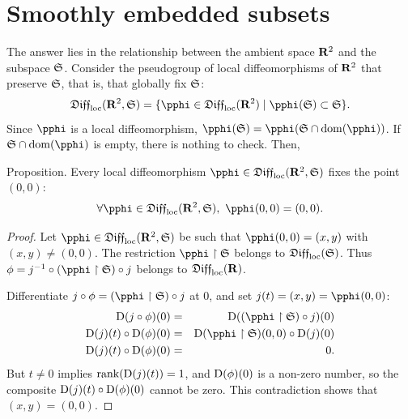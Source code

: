 \section{Smoothly embedded subsets}

The answer lies in the relationship between the ambient space $\mathbf{R}^2$ and the subspace ${\mathfrak S}$.
Consider the pseudogroup of local diffeomorphisms of $\mathbf{R}^2$ that preserve ${\mathfrak S}$,
that is,
that globally fix ${\mathfrak S}$:
$$
  \Diff_\loc(\RR^2,\fS) = \{\pphi \in \Diff_\loc(\RR^2) \mid \pphi(\fS) \subset \fS \}.
  $$
Since $\pphi$ is a local diffeomorphism, $\pphi(\fS) = \pphi(\fS \cap \Domain(\pphi))$.
If $\fS \cap \Domain(\pphi)$ is empty,
there is nothing to check.
Then,

\begin{Article}{Proposition.}{}
  Every local diffeomorphism $\pphi \in \Diff_\loc(\RR^2,\fS)$ fixes the point $(0,0)$:
  $$
    \forall \pphi \in \Diff_\loc(\RR^2,\fS),\ \pphi(0,0) = (0,0).
    $$
\end{Article}

\begin{proof}
  Let $\pphi \in \Diff_\loc(\RR^2,\fS)$ be such that $\pphi(0,0) = (x,y)$ with $(x,y) \neq (0,0)$.
  The restriction $\pphi \restriction \fS$ belongs to $\mathfrak{Diff}_{\mathrm{loc}}({\mathfrak S})$.
  Thus $\varphi = j^{-1} \circ (\pphi \restriction \fS) \circ j$ belongs to $\mathfrak{Diff}_{\mathrm{loc}}(\mathbf{R})$.
  \begin{center}
  \end{center}
  Differentiate $j \circ \varphi = (\pphi \restriction \fS) \circ j$ at $0$,
  and set $j(t) = (x,y) = \pphi(0,0)$:
  \begin{eqnarray*}
    \Der(j \circ \varphi)(0) & = & \Der((\pphi \restriction \fS) \circ j)(0) \\
    \Der(j)(t) \circ \Der(\varphi)(0) & = & \Der(\pphi \restriction \fS)(0,0) \circ \Der(j)(0) \\
    \Der(j)(t) \circ \Der(\varphi)(0)  & = & 0.
  \end{eqnarray*}
  But $t \neq 0$ implies $\operatorname{rank}(\operatorname{D}(j)(t)) = 1$,
  and $\operatorname{D}(\phi)(0)$ is a non-zero number,
  so the composite $\operatorname{D}(j)(t) \circ \operatorname{D}(\phi)(0)$ cannot be zero.
  This contradiction shows that $(x,y) = (0,0)$.
\end{proof}

